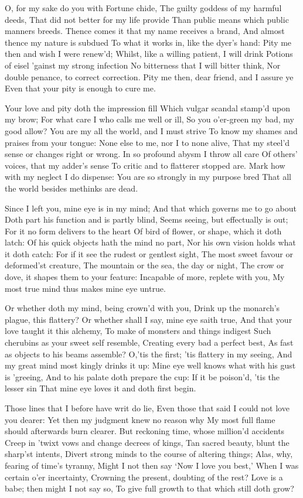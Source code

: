 \documentclass[twocolumn]{book}
\begin{document}
O, for my sake do you with Fortune chide,
The guilty goddess of my harmful deeds,
That did not better for my life provide
Than public means which public manners breeds.
Thence comes it that my name receives a brand,
And almost thence my nature is subdued
To what it works in, like the dyer's hand:
Pity me then and wish I were renew'd;
Whilst, like a willing patient, I will drink
Potions of eisel 'gainst my strong infection
No bitterness that I will bitter think,
Nor double penance, to correct correction.
  Pity me then, dear friend, and I assure ye
  Even that your pity is enough to cure me.


Your love and pity doth the impression fill
Which vulgar scandal stamp'd upon my brow;
For what care I who calls me well or ill,
So you o'er-green my bad, my good allow?
You are my all the world, and I must strive
To know my shames and praises from your tongue:
None else to me, nor I to none alive,
That my steel'd sense or changes right or wrong.
In so profound abysm I throw all care
Of others' voices, that my adder's sense
To critic and to flatterer stopped are.
Mark how with my neglect I do dispense:
  You are so strongly in my purpose bred
  That all the world besides methinks are dead.


Since I left you, mine eye is in my mind;
And that which governs me to go about
Doth part his function and is partly blind,
Seems seeing, but effectually is out;
For it no form delivers to the heart
Of bird of flower, or shape, which it doth latch:
Of his quick objects hath the mind no part,
Nor his own vision holds what it doth catch:
For if it see the rudest or gentlest sight,
The most sweet favour or deformed'st creature,
The mountain or the sea, the day or night,
The crow or dove, it shapes them to your feature:
  Incapable of more, replete with you,
  My most true mind thus makes mine eye untrue.


Or whether doth my mind, being crown'd with you,
Drink up the monarch's plague, this flattery?
Or whether shall I say, mine eye saith true,
And that your love taught it this alchemy,
To make of monsters and things indigest
Such cherubins as your sweet self resemble,
Creating every bad a perfect best,
As fast as objects to his beams assemble?
O,'tis the first; 'tis flattery in my seeing,
And my great mind most kingly drinks it up:
Mine eye well knows what with his gust is 'greeing,
And to his palate doth prepare the cup:
  If it be poison'd, 'tis the lesser sin
  That mine eye loves it and doth first begin.


Those lines that I before have writ do lie,
Even those that said I could not love you dearer:
Yet then my judgment knew no reason why
My most full flame should afterwards burn clearer.
But reckoning time, whose million'd accidents
Creep in 'twixt vows and change decrees of kings,
Tan sacred beauty, blunt the sharp'st intents,
Divert strong minds to the course of altering things;
Alas, why, fearing of time's tyranny,
Might I not then say `Now I love you best,'
When I was certain o'er incertainty,
Crowning the present, doubting of the rest?
  Love is a babe; then might I not say so,
  To give full growth to that which still doth grow?
\end{document}
